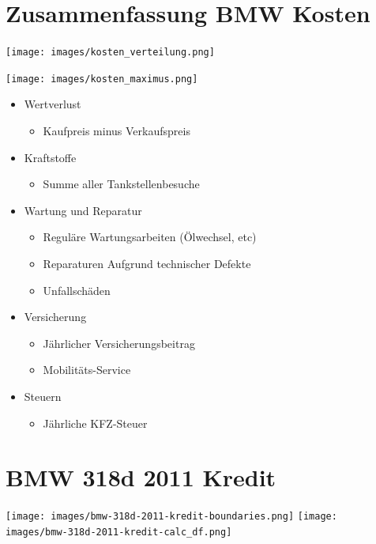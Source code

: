 \documentclass[landscape, DIV=99, 14pt]{scrartcl}
\begin{document}

\twocolumn
\section*{Zusammenfassung BMW Kosten}
\null
\vspace{1cm}
\begin{center}
\texttt{[image: images/kosten\_verteilung.png]}
\end{center}

\texttt{[image: images/kosten\_maximus.png]}

\pagebreak

\begin{itemize}
    \item Wertverlust
    \begin{itemize}
        \item Kaufpreis minus Verkaufspreis
    \end{itemize}
    \item Kraftstoffe
    \begin{itemize}
        \item Summe aller Tankstellenbesuche
    \end{itemize}
    \item Wartung und Reparatur
    \begin{itemize}
        \item Regul\"are Wartungsarbeiten (\"Olwechsel, etc)
        \item Reparaturen Aufgrund technischer Defekte
        \item Unfallsch\"aden
    \end{itemize}
    \item Versicherung
    \begin{itemize}
        \item J\"ahrlicher Versicherungsbeitrag
        \item Mobilit\"ats-Service
    \end{itemize}
    \item Steuern
    \begin{itemize}
            \item J\"ahrliche KFZ-Steuer
    \end{itemize}
\end{itemize}


\twocolumn

\section*{BMW 318d 2011 Kredit}
\begin{center}
\texttt{[image: images/bmw-318d-2011-kredit-boundaries.png]}
\null
\vspace{0.5cm}
\texttt{[image: images/bmw-318d-2011-kredit-calc\_df.png]}
\end{center}
\end{document}
